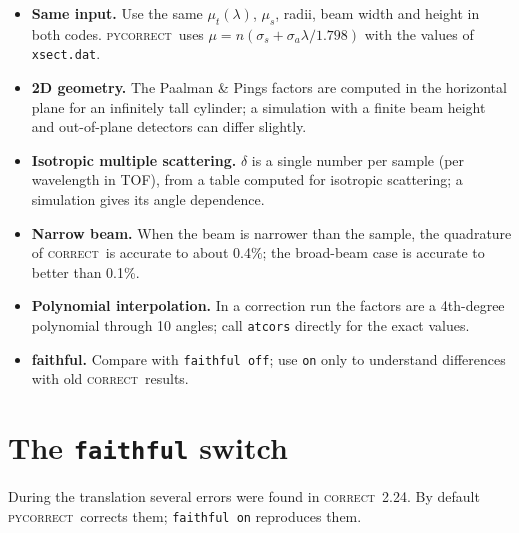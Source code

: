 \documentclass[11pt,a4paper]{report}
\newcommand{\cmd}[1]{\texttt{\color{accent}#1}}
\newcommand{\code}[1]{\texttt{#1}}
\newcommand{\file}[1]{\texttt{#1}}
\newcommand{\pyc}{\textsc{pycorrect}}
\newcommand{\cor}{\textsc{correct}}
\begin{document}
\begin{itemize}
  \item \textbf{Same input.} Use the same $\mu_t(\lambda)$, $\mu_s$, radii, beam
        width and height in both codes. \pyc\ uses
        $\mu = n(\sigma_s + \sigma_a\lambda/1.798)$ with the values of
        \file{xsect.dat}.
  \item \textbf{2D geometry.} The Paalman \& Pings factors are computed in the
        horizontal plane for an infinitely tall cylinder; a simulation with a
        finite beam height and out-of-plane detectors can differ slightly.
  \item \textbf{Isotropic multiple scattering.} $\delta$ is a single number per
        sample (per wavelength in TOF), from a table computed for isotropic
        scattering; a simulation gives its angle dependence.
  \item \textbf{Narrow beam.} When the beam is narrower than the sample, the
        quadrature of \cor\ is accurate to about 0.4\%; the broad-beam case is
        accurate to better than 0.1\%.
  \item \textbf{Polynomial interpolation.} In a correction run the factors are a
        4th-degree polynomial through 10 angles; call \code{atcors} directly for
        the exact values.
  \item \textbf{faithful.} Compare with \code{faithful off}; use \code{on} only to
        understand differences with old \cor\ results.
\end{itemize}

\chapter{The \texttt{faithful} switch}
\label{chap:faithful}

During the translation several errors were found in \cor\ 2.24. By default
\pyc\ corrects them; \cmd{faithful on} reproduces them.
\end{document}
